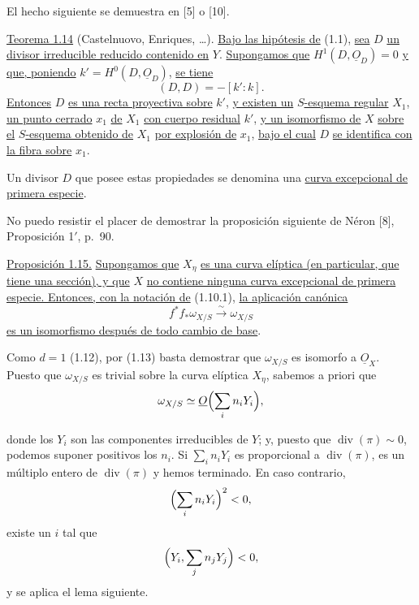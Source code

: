 \pageoriginale

El hecho siguiente se demuestra en [5] o [10].

\medskip
\noindent\underline{Teorema 1.14} (Castelnuovo, Enriques, \ldots).
\underline{Bajo las hipótesis de} (1.1), \underline{sea} $D$ \underline{un
divisor irreducible reducido contenido en} $Y$. \underline{Supongamos que}
$H^1(D,\underline{O}_D)=0$ \underline{y que, poniendo}
$k'=H^0(D,\underline{O}_D)$, \underline{se tiene}
\begin{equation*}
(D,D)=-[k':k].
\end{equation*}
\underline{Entonces} $D$ \underline{es una recta proyectiva sobre} $k'$,
\underline{y existen un} $S$\underline{-esquema regular} $X_1$,
\underline{un punto cerrado} $x_1$ \underline{de} $X_1$ \underline{con cuerpo
residual} $k'$, \underline{y un isomorfismo de} $X$ \underline{sobre el}
$S$\underline{-esquema obtenido de} $X_1$ \underline{por explosión de} $x_1$,
\underline{bajo el cual} $D$ \underline{se identifica con la fibra sobre}
$x_1$.

Un divisor $D$ que posee estas propiedades se denomina una
\underline{curva excepcional de primera especie}.

No puedo resistir el placer de demostrar la proposición siguiente de Néron [8],
Proposición 1$'$, p.~90.

\medskip
\noindent\underline{Proposición 1.15.}
\underline{Supongamos que} $X_\eta$ \underline{es una curva elíptica (en
particular, que tiene una sección), y que} $X$ \underline{no contiene ninguna
curva excepcional de primera especie. Entonces, con la notación de} (1.10.1),
\underline{la aplicación canónica}
\begin{equation*}
f^*f_*\omega_{X/S}\xrightarrow{\;\sim\;}\omega_{X/S}
\end{equation*}
\underline{es un isomorfismo después de todo cambio de base}.

Como $d=1$ (1.12), por (1.13) basta demostrar que $\omega_{X/S}$ es isomorfo a
$\underline{O}_X$. Puesto que $\omega_{X/S}$ es trivial sobre la curva elíptica
$X_\eta$, sabemos a priori que
\begin{equation*}
\omega_{X/S}\simeq\underline{O}\Bigl(\sum_i n_iY_i\Bigr),
\end{equation*}

\pageoriginale

donde los $Y_i$ son las componentes irreducibles de $Y$; y, puesto que
$\operatorname{div}(\pi)\sim0$, podemos suponer positivos los $n_i$. Si
$\sum_i n_iY_i$ es proporcional a $\operatorname{div}(\pi)$, es un múltiplo
entero de $\operatorname{div}(\pi)$ y hemos terminado. En caso contrario,
\begin{equation*}
\Bigl(\sum_i n_iY_i\Bigr)^2<0,
\end{equation*}
existe un $i$ tal que
\begin{equation*}
\Bigl(Y_i,\sum_j n_jY_j\Bigr)<0,
\end{equation*}
y se aplica el lema siguiente.

